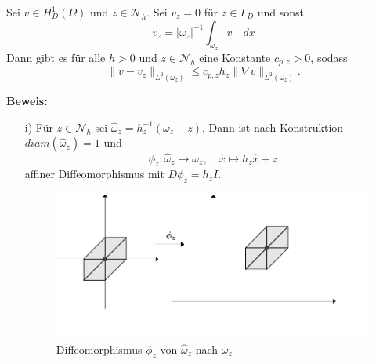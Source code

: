 \begin{lemma}\label{lemma}
	Sei $v \in H^1_D(\Omega)$ und $z\in \mathscr{N}_h.$ Sei $v_z= 0$ für $z\in \Gamma_D$ und sonst
	\[ v_z = |\omega_z|^{-1} \int_{\omega_z} v \quad dx
	\]
	Dann gibt es für alle $h > 0$ und $z \in \mathscr{N}_h$ eine Konstante $c_{p,z}>0$, sodass
	\[
	\|v-v_z\|_{L^2(\omega_z)}\leq c_{p,z}h_z\|\nabla v\|_{L^2(\omega_z)}.
	\]
\end{lemma}
\textbf{Beweis:}
\begin{itemize}
	\item[i)] 
	Für $z\in \mathscr{N}_h$ sei $\widehat{\omega}_z = h_z^{-1}(\omega_z - z)$. Dann ist nach Konstruktion $diam(\widehat{\omega}_z) = 1$ und
	\[
	\phi_z : \widehat{\omega}_z \rightarrow \omega_z, \quad \hat{x} \mapsto h_z\hat{x}+z
	\]
	affiner Diffeomorphismus mit $D\phi_z = h_zI$.
	
	\begin{figure}[!htbp]
		\begin{center}
			\includegraphics[width=15cm]{pics/omega.png}
		\end{center}
		\caption{Diffeomorphismus $\phi_z$ von $\widehat{\omega}_z$ nach $\omega_z$}
	\end{figure}


\end{itemize}
